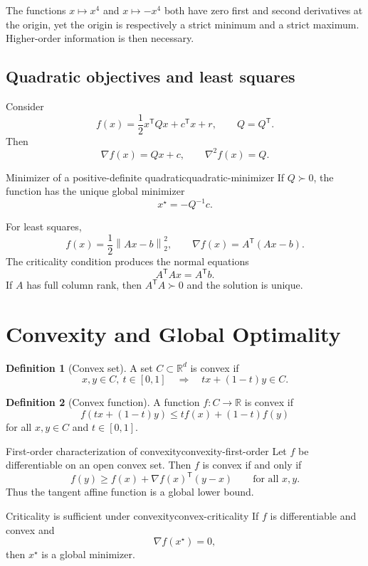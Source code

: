 \documentclass[11pt]{article}
\newcommand{\R}{\mathbb{R}}
\newcommand{\trans}{^{\mathsf T}}
\newcommand{\grad}{\nabla}
\newcommand{\norm}[1]{\left\lVert#1\right\rVert}
\theoremstyle{definition}
\newtheorem{definition}{Definition}[section]
\theoremstyle{remark}
\begin{document}
The functions $x\mapsto x^4$ and $x\mapsto-x^4$ both have zero first and
second derivatives at the origin, yet the origin is respectively a strict
minimum and a strict maximum. Higher-order information is then necessary.

\subsection{Quadratic objectives and least squares}

Consider
\[
  f(x)=\frac12x\trans Qx+c\trans x+r,
  \qquad Q=Q\trans.
\]
Then
\[
  \grad f(x)=Qx+c,
  \qquad \grad^2f(x)=Q.
\]

\begin{keyproposition}{Minimizer of a positive-definite quadratic}{quadratic-minimizer}
If $Q\succ0$, the function has the unique global minimizer
\[
  \boxed{x^\star=-Q^{-1}c.}
\]
\end{keyproposition}

For least squares,
\[
  f(x)=\frac12\norm{Ax-b}_2^2,
  \qquad
  \grad f(x)=A\trans(Ax-b).
\]
The criticality condition produces the normal equations
\[
  \boxed{A\trans A x=A\trans b.}
\]
If $A$ has full column rank, then $A\trans A\succ0$ and the solution is unique.

\section{Convexity and Global Optimality}

\begin{definition}[Convex set]
A set $C\subset\R^d$ is convex if
\[
  x,y\in C,\ t\in[0,1]
  \quad\Longrightarrow\quad
  tx+(1-t)y\in C.
\]
\end{definition}

\begin{definition}[Convex function]
A function $f:C\to\R$ is convex if
\[
  f(tx+(1-t)y)\leq tf(x)+(1-t)f(y)
\]
for all $x,y\in C$ and $t\in[0,1]$.
\end{definition}

\begin{keyproposition}{First-order characterization of convexity}{convexity-first-order}
Let $f$ be differentiable on an open convex set. Then $f$ is convex if and only if
\[
  \boxed{f(y)\geq f(x)+\grad f(x)\trans(y-x)
  \qquad\text{for all }x,y.}
\]
Thus the tangent affine function is a global lower bound.
\end{keyproposition}

\begin{keyproposition}{Criticality is sufficient under convexity}{convex-criticality}
If $f$ is differentiable and convex and
\[
  \grad f(x^\star)=0,
\]
then $x^\star$ is a global minimizer.
\end{keyproposition}
\end{document}
